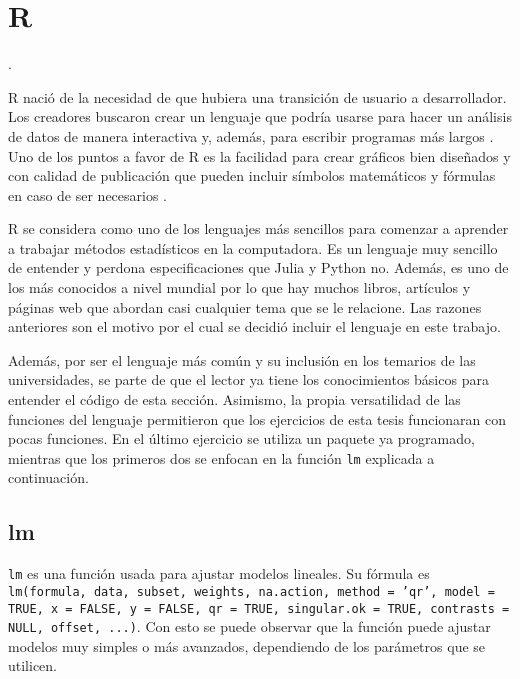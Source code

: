 \chapter{R}

 \cite{laberintos_historiaR}. 

\textsf{R} nació de la necesidad de que hubiera una transición de usuario a desarrollador. Los creadores buscaron crear un lenguaje que podría usarse para hacer un análisis de datos de manera interactiva y, además, para escribir programas más largos \cite{peng_programming}. Uno de los puntos a favor de \textsf{R} es la facilidad para crear gráficos bien diseñados y con calidad de publicación que pueden incluir símbolos matemáticos y fórmulas en caso de ser necesarios \cite{pagina_r}. 

\textsf{R} se considera como uno de los lenguajes más sencillos para comenzar a aprender a trabajar métodos estadísticos en la computadora. Es un lenguaje muy sencillo de entender y perdona especificaciones que \textsf{Julia} y \textsf{Python} no. Además, es uno de los más conocidos a nivel mundial por lo que hay muchos libros, artículos y páginas web que abordan casi cualquier tema que se le relacione. Las razones anteriores son el motivo por el cual se decidió incluir el lenguaje en este trabajo. 

Además, por ser el lenguaje más común y su inclusión en los temarios de las universidades, se parte de que el lector ya tiene los conocimientos básicos para entender el código de esta sección. Asimismo, la propia versatilidad de las funciones del lenguaje permitieron que los ejercicios de esta tesis funcionaran con pocas funciones. En el último ejercicio se utiliza un paquete ya programado, mientras que los primeros dos se enfocan en la función \texttt{lm} explicada a continuación. 

\section{lm} \label{explicacion_lm}

\texttt{lm} es una función usada para ajustar modelos lineales. Su fórmula es \texttt{lm(formula, data, subset, weights, na.action, method = 'qr', model = TRUE, x = FALSE, y = FALSE, qr = TRUE, singular.ok = TRUE, contrasts = NULL, offset, ...)}. Con esto se puede observar que la función puede ajustar modelos muy simples o más avanzados, dependiendo de los parámetros que se utilicen.


